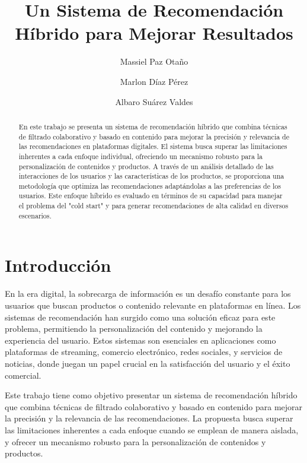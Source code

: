 \documentclass{llncs}
\begin{document}
\title{Un Sistema de Recomendación Híbrido para Mejorar Resultados}
\author{Massiel Paz Otaño \and Marlon Díaz Pérez \and Albaro Suárez Valdes}

\maketitle

\begin{abstract}
En este trabajo se presenta un sistema de recomendación híbrido que combina técnicas de filtrado colaborativo y basado en contenido para mejorar la precisión y relevancia de las recomendaciones en plataformas digitales. El sistema busca superar las limitaciones inherentes a cada enfoque individual, ofreciendo un mecanismo robusto para la personalización de contenidos y productos. A través de un análisis detallado de las interacciones de los usuarios y las características de los productos, se proporciona una metodología que optimiza las recomendaciones adaptándolas a las preferencias de los usuarios. Este enfoque híbrido es evaluado en términos de su capacidad para manejar el problema del "cold start" y para generar recomendaciones de alta calidad en diversos escenarios.
\end{abstract}

\section{Introducción}
En la era digital, la sobrecarga de información es un desafío constante para los usuarios que buscan productos o contenido relevante en plataformas en línea. Los sistemas de recomendación han surgido como una solución eficaz para este problema, permitiendo la personalización del contenido y mejorando la experiencia del usuario. Estos sistemas son esenciales en aplicaciones como plataformas de streaming, comercio electrónico, redes sociales, y servicios de noticias, donde juegan un papel crucial en la satisfacción del usuario y el éxito comercial.

Este trabajo tiene como objetivo presentar un sistema de recomendación híbrido que combina técnicas de filtrado colaborativo y basado en contenido para mejorar la precisión y la relevancia de las recomendaciones. La propuesta busca superar las limitaciones inherentes a cada enfoque cuando se emplean de manera aislada, y ofrecer un mecanismo robusto para la personalización de contenidos y productos.
\end{document}

